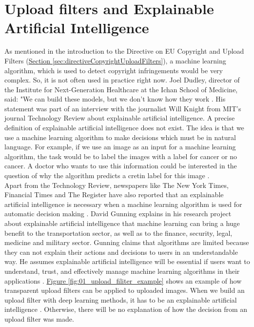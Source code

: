 \section{Upload filters and Explainable Artificial Intelligence}
\label{sec:uploadFiltersXAI}

As mentioned in the introduction to the Directive on EU Copyright and Upload Filters (\hyperref[sec:directiveCopyrightUploadFilters]{Section \ref{sec:directiveCopyrightUploadFilters}}), a machine learning algorithm, which is used to detect copyright infringements would be very complex. So, it is not often used in practice right now. Joel Dudley, director of the Institute for Next-Generation Healthcare at the Ichan School of Medicine, said: "We can build these models, but we don't know how they work \cite{Knight2019}. His statement was part of an interview with the journalist Will Knight from MIT's journal Technology Review about explainable artificial intelligence. A precise definition of explainable artificial intelligence does not exist. The idea is that we use a machine learning algorithm to make decisions which must be in natural language. For example, if we use an image as an input for a machine learning algorithm, the task would be to label the images with a label for cancer or no cancer. A doctor who wants to use this information could be interested in the question of why the algorithm predicts a cretin label for this image \cite{SamekWojciech2017}.\\

Apart from the Technology Review, newspapers like The New York Times, Financial Times and The Register have also reported that an explainable artificial intelligence is necessary when a machine learning algorithm is used for automatic decision making \cite{Kuang2017} \cite{Robinson2017} \cite{Waters2017}. David Gunning explains in his research project about explainable artificial intelligence that machine learning can bring a huge benefit to the transportation sector, as well as to the finance, security, legal, medicine and military sector. Gunning claims that algorithms are limited because they can not explain their actions and decisions to users in an understandable way. He assumes explainable artificial intelligence will be essential if users want to understand, trust, and effectively manage machine learning algorithms in their applications \cite{Gunning2019}. \hyperref[fig:01_upload_filiter_example]{Figure \ref{fig:01_upload_filiter_example}} shows an example of how transparent upload filters can be applied to uploaded images. When we build an upload filter with deep learning methods, it has to be an explainable artificial intelligence \cite{WaltermannHubertus2019}. Otherwise, there will be no explanation of how the decision from an upload filter was made.\\

